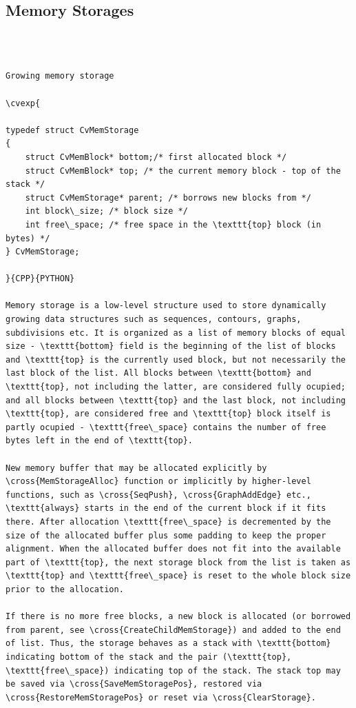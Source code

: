 \subsection{Memory Storages}
\begin{verbatim}


\end{verbatim}
\label{CvMemStorage}
\begin{verbatim}

Growing memory storage

\cvexp{

typedef struct CvMemStorage
{
    struct CvMemBlock* bottom;/* first allocated block */
    struct CvMemBlock* top; /* the current memory block - top of the stack */
    struct CvMemStorage* parent; /* borrows new blocks from */
    int block\_size; /* block size */
    int free\_space; /* free space in the \texttt{top} block (in bytes) */
} CvMemStorage;

}{CPP}{PYTHON}

Memory storage is a low-level structure used to store dynamically growing data structures such as sequences, contours, graphs, subdivisions etc. It is organized as a list of memory blocks of equal size - \texttt{bottom} field is the beginning of the list of blocks and \texttt{top} is the currently used block, but not necessarily the last block of the list. All blocks between \texttt{bottom} and \texttt{top}, not including the latter, are considered fully ocupied; and all blocks between \texttt{top} and the last block, not including \texttt{top}, are considered free and \texttt{top} block itself is partly ocupied - \texttt{free\_space} contains the number of free bytes left in the end of \texttt{top}.

New memory buffer that may be allocated explicitly by \cross{MemStorageAlloc} function or implicitly by higher-level functions, such as \cross{SeqPush}, \cross{GraphAddEdge} etc., \texttt{always} starts in the end of the current block if it fits there. After allocation \texttt{free\_space} is decremented by the size of the allocated buffer plus some padding to keep the proper alignment. When the allocated buffer does not fit into the available part of \texttt{top}, the next storage block from the list is taken as \texttt{top} and \texttt{free\_space} is reset to the whole block size prior to the allocation.

If there is no more free blocks, a new block is allocated (or borrowed from parent, see \cross{CreateChildMemStorage}) and added to the end of list. Thus, the storage behaves as a stack with \texttt{bottom} indicating bottom of the stack and the pair (\texttt{top}, \texttt{free\_space}) indicating top of the stack. The stack top may be saved via \cross{SaveMemStoragePos}, restored via \cross{RestoreMemStoragePos} or reset via \cross{ClearStorage}.


\end{verbatim}
